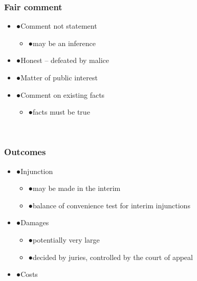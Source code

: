 \documentclass[ignorenonframetext,]{beamer}
\begin{document}
\begin{frame}
\frametitle{Fair comment}

\begin{itemize}
\item  {●}Comment not statement

  \begin{itemize}
  \item    {●}may be an inference
  \end{itemize}
\item  {●}Honest -- defeated by {malice }
\item  {●}{Matter of public interest}
\item  {●}{Comment on existing facts}

  \begin{itemize}
  \item    {●}{facts must be true}
  \end{itemize}
\end{itemize}

~


\end{frame}

\begin{frame}
\frametitle{Outcomes}

\begin{itemize}
\item  {●}Injunction

  \begin{itemize}
  \item    {●}may be made in the interim
  \item    {●}balance of convenience test for interim injunctions
  \end{itemize}
\item  {●}Damages

  \begin{itemize}
  \item    {●}potentially very large
  \item    {●}decided by juries, controlled by the court of appeal
  \end{itemize}
\item  {●}Costs
\end{itemize}

~


\end{frame}
\end{document}
